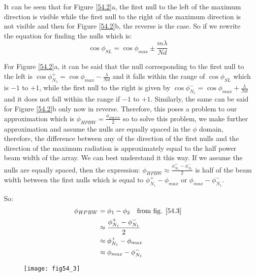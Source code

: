 It can be seen that for Figure \ref{54.2}a, the first null to the left of the maximum direction  is visible while the first null to the right of the maximum direction is not visible and then for Figure \ref{54.2}b, the reverse is the case. So if we rewrite the equation for finding the nulls which is:
\begin{equation}
\cos{\phi_{SL}} = \cos{\phi_{max}} \pm \frac{m \lambda}{N d} 
\end{equation}

For Figure \ref{54.2}a, it can be said that the null corresponding to the first null to the left is $\cos{\phi^+_{N_1}} = \cos{\phi_{max}} - \frac{ \lambda}{N d} $ and it falls within the range of $\cos{\phi_{SL}}$ which is $-1$ to $+1$, while the first null to the right is given by $\cos{\phi^-_{N_1}} = \cos{\phi_{max}} + \frac{ \lambda}{N d} $ and it does not fall within the range if $-1$ to $+1$. Similarly, the same can be said for Figure \ref{54.2}b only now in reverse. Therefore, this poses a problem to our approximation which is $\phi_{HPBW} = \frac{ \phi_{BWFN}}{2}$ so to solve this problem, we make further approximation and assume the nulls are equally spaced in the $\phi$  domain, therefore, the difference between any of the direction of the first nulls and the direction of the maximum radiation is approximately equal to the half power beam width of the array. We can best understand it this way. If we assume the nulls are equally spaced, then the expression:
$
\phi_{HPBW} \approx \frac{\phi^+_{N_1} - \phi^-_{N_1}}{2}
$
is half of the beam width between the first nulls which is equal to $\phi^+_{N_1} - \phi_{max}$ or  $\phi_{max} - \phi^-_{N_1}$.

So:
\begin{equation}
\begin{split}
\phi_{HPBW} & = \phi_{1}  - \phi_{2}\quad \text{from fig. \ref{54.3}}\\
&\approx \frac{\phi^+_{N_1} - \phi^-_{N_1}}{2} \\
& \approx \phi^+_{N_1} - \phi_{max} \\
& \approx \phi_{max} - \phi^-_{N_1}
\end{split}
\end{equation}

\begin{figure}
	\centering
	\texttt{[image: fig54\_3]}
	\caption{}
	
	\label{54.3}
	
\end{figure}

